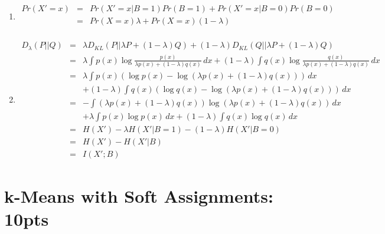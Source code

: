 \documentclass[12pt]{article}
\begin{document}
\begin{enumerate}
    \item \begin{eqnarray}
        Pr(X' = x) &=& Pr(X' = x|B = 1)Pr(B = 1) + Pr(X' = x|B = 0) Pr(B = 0) \nonumber \\ 
        &=& Pr(X = x) \lambda + Pr(X = x) (1-\lambda)\nonumber\\
    \end{eqnarray}

    \item \begin{eqnarray}
        D_{\lambda}(P || Q) &=& \lambda D_{KL}(P || \lambda P + (1- \lambda) Q) + (1-\lambda) D_{KL}(Q || \lambda P + (1- \lambda) Q) \nonumber \\ 
        &=& \lambda \int p(x) \log \frac{p(x)}{\lambda p(x) + (1-\lambda) q(x)}\,dx + (1-\lambda) \int q(x) \log \frac{q(x)}{\lambda p(x) + (1-\lambda) q(x)}\,dx \nonumber\\ 
        &=& \lambda \int p(x) (\log p(x) - \log (\lambda p(x) + (1-\lambda)q(x))) \,dx \nonumber\\ 
        && + (1-\lambda) \int q(x) (\log q(x) - \log (\lambda p(x) + (1-\lambda)q(x))) \,dx \nonumber\\
        &=& -\int (\lambda p(x) + (1-\lambda)q(x)) \log (\lambda p(x) +  (1-\lambda)q(x)) \,dx  \nonumber\\
        && + \lambda \int p(x) \log p(x) \,dx + (1-\lambda) \int q(x) \log q(x) \,dx \nonumber\\ 
        &=& H(X') - \lambda H(X'|B = 1) - (1-\lambda) H(X' | B = 0) \nonumber\\
        &=& H(X') - H(X' | B)\nonumber\\ \nonumber
        &=& I(X'; B)
    \end{eqnarray}
\end{enumerate}

\section{k-Means with Soft Assignments: 10pts}
\end{document}
